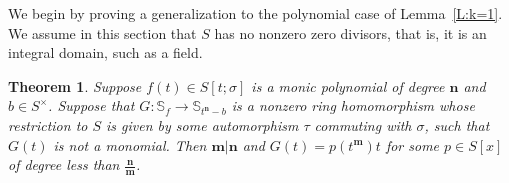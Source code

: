 \documentclass[11pt]{amsart}
\theoremstyle{plain}
\newtheorem{theorem}{Theorem}[section]
\theoremstyle{definition}
\numberwithin{equation}{section}
\numberwithin{figure}{section}
\newcommand{\Sf}{\Stsigma/\Stsigma f(t)} %
\newcommand{\Sone}[1]{\Stsigma/\Stsigma (t^{\de}-#1)} %
\newcommand{\ring}{S}
\newcommand{\Stsigma}{S[t;\sigma]}
\newcommand{\os}{\mathbf{m}}  %
\newcommand{\de}{\mathbf{n}}  %
\begin{document}
We begin by proving a generalization to the polynomial case of Lemma~\ref{L:k=1}.  We assume in this section that $\ring$ has no nonzero zero divisors, that is, it is an integral domain, such as a field.


\begin{theorem}
    \label{P:polyndivm}
    Suppose $f(t)\in \Stsigma$ is a monic polynomial of degree $\de$ and $b\in \ring^\times$.  Suppose that $G:\mathbb{S}_f \to \mathbb{S}_{t^\de-b}$
    is a nonzero ring homomorphism  whose restriction to $\ring$ is given by some automorphism $\tau$ commuting with $\sigma$, such that $G(t)$ is not a monomial.  Then $\os|\de$ and
    $G(t) = p(t^{\os})t$ for some $p\in \ring[x]$ of degree less than $\frac{\de}{\os}$.
\end{theorem}
\end{document}
